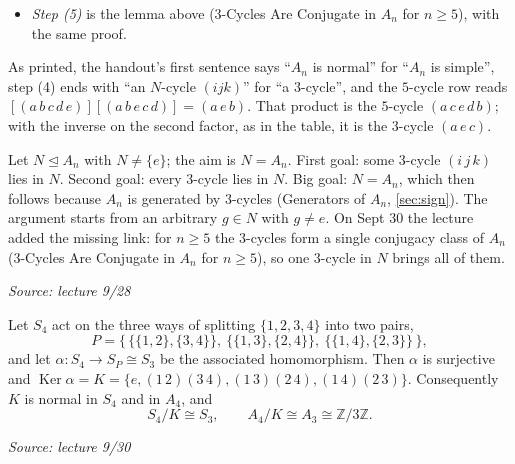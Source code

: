 \documentclass[11pt]{report}
\newcommand{\srcline}[1]{\par\hfill{\footnotesize\textit{Source: #1}}}
\begin{document}
\begin{rembox}
\begin{itemize}
\begin{center}
\begin{tabular}{l|l|l}
    $2+2$ & $[(a\,b)(c\,d)]\,[(a\,b)(d\,e)] = (c\,d\,e)$ & $\sigma = (c\,d\,e)$ \\
    $5$ & $[(a\,b\,c\,d\,e)]\,[(a\,b\,e\,c\,d)]^{-1} = (a\,e\,c)$ & $\sigma = (c\,e\,d)$ \\
    $3+3$ & $[(a\,b\,c)(d\,e\,f)]\,[(c\,b\,a)(d\,e\,f)] = (f\,e\,d)$ & $\sigma = (a\,d)(b\,e\,c\,f)$
    \end{tabular}
    \end{center}
    Each $\sigma$ is even, so the second factor is an $A_n$-conjugate of the first and lies in $N$; so does its inverse. In the $3+3$ row the two $3$-cycles on $\{a, b, c\}$ cancel and $(d\,e\,f)^2 = (f\,e\,d)$, so this case reaches a $3$-cycle directly, without the detour through a $5$-cycle taken above. The $2+2$ row needs a fifth point $e$, so $n \geq 5$: in $A_4$ no $3$-cycle is a product of double transpositions, since these lie in the subgroup $K$ (Why $n \geq 5$, \ref{rem:why-n-ge-5}).
    \item \emph{Step (5)} is the lemma above ($3$-Cycles Are Conjugate in $A_n$ for $n \geq 5$), with the same proof.
\end{itemize}
As printed, the handout's first sentence says ``$A_n$ is normal'' for ``$A_n$ is simple'', step (4) ends with ``an $N$-cycle $(ijk)$'' for ``a $3$-cycle'', and the $5$-cycle row reads $[(a\,b\,c\,d\,e)][(a\,b\,e\,c\,d)] = (a\,e\,b)$. That product is the $5$-cycle $(a\,c\,e\,d\,b)$; with the inverse on the second factor, as in the table, it is the $3$-cycle $(a\,e\,c)$.
\end{rembox}

\begin{rembox}\label{rem:strategy}
Let $N \trianglelefteq A_n$ with $N \neq \{e\}$; the aim is $N = A_n$. First goal: some $3$-cycle $(i\,j\,k)$ lies in $N$. Second goal: every $3$-cycle lies in $N$. Big goal: $N = A_n$, which then follows because $A_n$ is generated by $3$-cycles (Generators of $A_n$, \ref{sec:sign}). The argument starts from an arbitrary $g \in N$ with $g \neq e$. On Sept 30 the lecture added the missing link: for $n \geq 5$ the $3$-cycles form a single conjugacy class of $A_n$ ($3$-Cycles Are Conjugate in $A_n$ for $n \geq 5$), so one $3$-cycle in $N$ brings all of them.
\srcline{lecture 9/28}
\end{rembox}

\begin{propbox}\label{prop:pair-partition-homomorphism-s4-to-s3}
Let $S_4$ act on the three ways of splitting $\{1, 2, 3, 4\}$ into two pairs,
\[ P = \big\{\, \{\{1,2\},\{3,4\}\},\ \{\{1,3\},\{2,4\}\},\ \{\{1,4\},\{2,3\}\} \,\big\}, \]
and let $\alpha: S_4 \to S_P \cong S_3$ be the associated homomorphism. Then $\alpha$ is surjective and $\operatorname{Ker}\alpha = K = \{e, (1\,2)(3\,4), (1\,3)(2\,4), (1\,4)(2\,3)\}$. Consequently $K$ is normal in $S_4$ and in $A_4$, and
\[ S_4/K \cong S_3, \qquad A_4/K \cong A_3 \cong \mathbb{Z}/3\mathbb{Z}. \]
\srcline{lecture 9/30}
\end{propbox}
\end{document}
